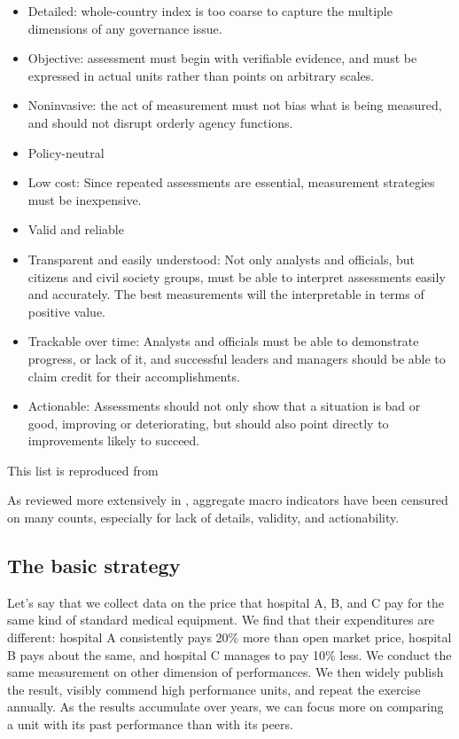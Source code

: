 \documentclass[12pt]{article}
\begin{document}
\begin{boxedminipage}{\textwidth}
\begin{itemize}[noitemsep]
\item{Detailed: whole-country index is too coarse to capture the multiple dimensions of any governance issue.}
\item{Objective: assessment must begin with verifiable evidence, and must be expressed in actual units rather than points on arbitrary scales.}
\item{Noninvasive: the act of measurement must not bias what is being measured, and should not disrupt orderly agency functions.}
\item{Policy-neutral}
\item{Low cost: Since repeated assessments are essential, measurement strategies must be inexpensive.}
\item{Valid and reliable}
\item{Transparent and easily understood: Not only analysts and officials, but citizens and civil society groups, must be able to interpret assessments easily and accurately. The best measurements will the interpretable in terms of positive value.}
\item{Trackable over time: Analysts and officials must be able to demonstrate progress, or lack of it, and successful leaders and managers should be able to claim credit for their accomplishments.}
\item{Actionable: Assessments should not only show that a situation is bad or good, improving or deteriorating, but should also point directly to improvements likely to succeed.}
\end{itemize}
\end{boxedminipage}
This list is reproduced from \citet{Johnston2010}
\bigskip

As reviewed more extensively in \citet{Pande2013}, aggregate macro indicators have been censured on many counts, especially for lack of details, validity, and actionability.

\subsection{The basic strategy}
\label{sec:strategy}

Let's say that we collect data on the price that hospital A, B, and C pay for the same kind of standard medical equipment. We find that their expenditures are different: hospital A consistently pays 20\% more than open market price, hospital B pays about the same, and hospital C manages to pay 10\% less. We conduct the same measurement on other dimension of performances. We then widely publish the result, visibly commend high performance units, and repeat the exercise annually. As the results accumulate over years, we can focus more on comparing a unit with its past performance than with its peers.
\end{document}
